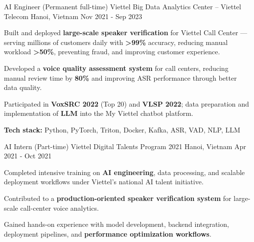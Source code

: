 \begin{cventries}
  \cventry
    {AI Engineer (Permanent full-time)}
    {Viettel Big Data Analytics Center – Viettel Telecom}
    {Hanoi, Vietnam}
    {Nov 2021 - Sep 2023}
    {
      \begin{cvitems}
        \item {Built and deployed \textbf{large-scale speaker verification} for Viettel Call Center --- serving millions of customers daily with \textbf{>99\%} accuracy, reducing manual workload \textbf{>50\%}, preventing fraud, and improving customer experience.}
        \item {Developed a \textbf{voice quality assessment system} for call centers, reducing manual review time by \textbf{80\%} and improving ASR performance through better data quality.}
        \item {Participated in \textbf{VoxSRC 2022} (Top 20) and \textbf{VLSP 2022}; data preparation and implementation of \textbf{LLM} into the My Viettel chatbot platform.}
        \item {\textbf{Tech stack:} Python, PyTorch, Triton, Docker, Kafka, ASR, VAD, NLP, LLM}
      \end{cvitems}
    }

  \cventry
    {AI Intern (Part-time)}
    {Viettel Digital Talents Program 2021}
    {Hanoi, Vietnam}
    {Apr 2021 - Oct 2021}
    {
      \begin{cvitems}
        \item {Completed intensive training on \textbf{AI engineering}, data processing, and scalable deployment workflows under Viettel’s national AI talent initiative.}
        \item {Contributed to a \textbf{production-oriented speaker verification system} for large-scale call-center voice analytics.}
        \item {Gained hands-on experience with model development, backend integration, deployment pipelines, and \textbf{performance optimization workflows}.}
      \end{cvitems}
    }
    
\end{cventries}
    

